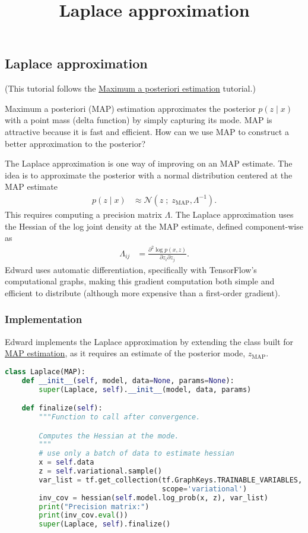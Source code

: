 \title{Laplace approximation}

\subsection{Laplace approximation}

(This tutorial follows the
\href{tut_MAP}{Maximum a posteriori estimation} tutorial.)

Maximum a posteriori (MAP) estimation approximates the posterior $p(z \mid x)$
with a point mass (delta function) by simply capturing its mode. MAP is
attractive because it is fast and efficient. How can we use MAP to construct a
better approximation to the posterior?

The Laplace approximation is one way of improving on an MAP estimate. The idea
is to approximate the posterior with a normal distribution centered at the MAP
estimate
\begin{align*}
  p(z \mid x)
  &\approx
  \mathcal{N}(z\;;\; z_\text{MAP}, \Lambda^{-1}).
\end{align*}
This requires computing a precision matrix $\Lambda$. The Laplace approximation
uses the Hessian of the log joint density at the MAP estimate,
defined component-wise as
\begin{align*}
  \Lambda_{ij}
  &=
  \frac{\partial^2 \log p(x, z)}{\partial z_i \partial z_j}.
\end{align*}
Edward uses automatic differentiation, specifically with TensorFlow's
computational graphs, making this gradient computation both simple and
efficient to distribute (although more expensive than a first-order
gradient).

\subsubsection{Implementation}

Edward implements the Laplace approximation by extending the class built for
\href{tut_MAP}{MAP estimation}, as it requires an estimate of the
posterior mode, $z_\text{MAP}$.

\begin{lstlisting}[language=Python]
class Laplace(MAP):
    def __init__(self, model, data=None, params=None):
        super(Laplace, self).__init__(model, data, params)

    def finalize(self):
        """Function to call after convergence.

        Computes the Hessian at the mode.
        """
        # use only a batch of data to estimate hessian
        x = self.data
        z = self.variational.sample()
        var_list = tf.get_collection(tf.GraphKeys.TRAINABLE_VARIABLES,
                                     scope='variational')
        inv_cov = hessian(self.model.log_prob(x, z), var_list)
        print("Precision matrix:")
        print(inv_cov.eval())
        super(Laplace, self).finalize()
\end{lstlisting}

